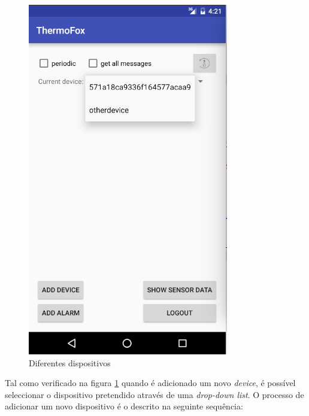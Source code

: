 \documentclass[a4paper]{article}
\begin{document}
\begin{figure}[H]
  \includegraphics[width=\linewidth]{drop.png}
  \caption{Diferentes dispositivos}\label{fig:login}
\endminipage
\end{figure}

Tal como verificado na figura \ref{fig:login} quando é adicionado um novo \textit{device}, é possível seleccionar o dispositivo pretendido através de uma \textit{drop-down list}. O processo de adicionar um novo dispositivo é o descrito na seguinte sequência:
\end{document}
